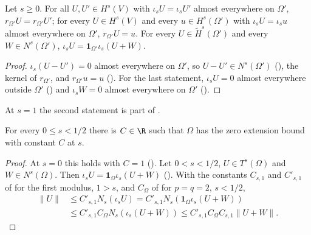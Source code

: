 \begin{lemma}
\label{lem:restriction-l2-functions}
\leanok
{}
Let $s \geq 0$. For all $U, U' \in H^s(V)$ with $\iota_s U = \iota_s U'$ almost everywhere on
$\Omega'$, $r_{\Omega'} U = r_{\Omega'} U'$; for every $U \in H^s(V)$ and every
$u \in H^s(\Omega')$ with $\iota_s U = \iota_s u$ almost everywhere on $\Omega'$,
$r_{\Omega'} U = u$. For every $U \in \tilde H^s(\Omega')$ and every $W \in N^s(\Omega')$,
$\iota_s U = \mathbf 1_{\Omega'} \iota_s(U + W)$.
\end{lemma}

\begin{proof}
\leanok
$\iota_s(U - U') = 0$ almost everywhere on $\Omega'$, so $U - U' \in N^s(\Omega')$
(), the kernel of $r_{\Omega'}$, and $r_{\Omega'} u = u$
(). For the last statement, $\iota_s U = 0$ almost everywhere
outside $\Omega'$ () and $\iota_s W = 0$ almost
everywhere on $\Omega'$ ().
\end{proof}

At $s = 1$ the second statement is part of .

\begin{theorem}
\label{thm:zero-extension-small}
\leanok
{}
For every $0 \leq s < 1/2$ there is $C \in \R$ such that $\Omega$ has the zero extension bound
with constant $C$ at $s$.
\end{theorem}

\begin{proof}
\leanok
At $s = 0$ this holds with $C = 1$ (). Let $0 < s < 1/2$,
$U \in T^s(\Omega)$ and $W \in N^s(\Omega)$. Then $\iota_s U = \mathbf 1_\Omega \iota_s(U + W)$
(). With the constants $C_{s,1}$ and $C'_{s,1}$ of
 for the first modulus, $1 > s$, and $C_\Omega$ of
 for $p = q = 2$, $s < 1/2$,
\begin{align*}
  \|U\| &\leq C'_{s,1} N_s(\iota_s U) = C'_{s,1} N_s(\mathbf 1_\Omega \iota_s(U + W)) \\
  &\leq C'_{s,1} C_\Omega N_s(\iota_s(U + W)) \leq C'_{s,1} C_\Omega C_{s,1} \|U + W\| .
\end{align*}
\end{proof}

